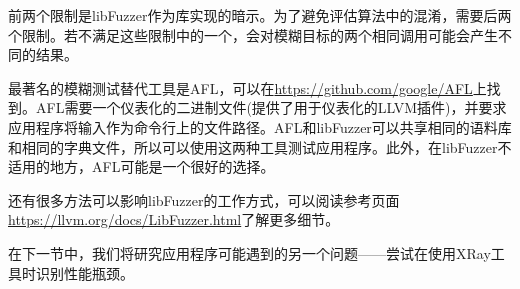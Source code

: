 前两个限制是libFuzzer作为库实现的暗示。为了避免评估算法中的混淆，需要后两个限制。若不满足这些限制中的一个，会对模糊目标的两个相同调用可能会产生不同的结果。

最著名的模糊测试替代工具是AFL，可以在\url{https://github.com/google/AFL}上找到。AFL需要一个仪表化的二进制文件(提供了用于仪表化的LLVM插件)，并要求应用程序将输入作为命令行上的文件路径。AFL和libFuzzer可以共享相同的语料库和相同的字典文件，所以可以使用这两种工具测试应用程序。此外，在libFuzzer不适用的地方，AFL可能是一个很好的选择。

还有很多方法可以影响libFuzzer的工作方式，可以阅读参考页面\url{https://llvm.org/docs/LibFuzzer.html}了解更多细节。

在下一节中，我们将研究应用程序可能遇到的另一个问题——尝试在使用XRay工具时识别性能瓶颈。




























